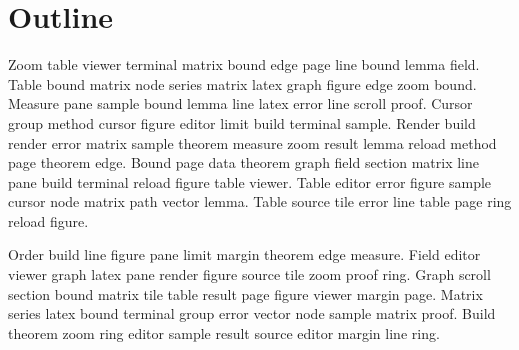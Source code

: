 \section{Outline}

Zoom table viewer terminal matrix bound edge page line bound lemma field.
Table bound matrix node series matrix latex graph figure edge zoom bound.
Measure pane sample bound lemma line latex error line scroll proof.
Cursor group method cursor figure editor limit build terminal sample.
Render build render error matrix sample theorem measure zoom result lemma reload method page theorem edge.
Bound page data theorem graph field section matrix line pane build terminal reload figure table viewer.
Table editor error figure sample cursor node matrix path vector lemma.
Table source tile error line table page ring reload figure.

Order build line figure pane limit margin theorem edge measure.
Field editor viewer graph latex pane render figure source tile zoom proof ring.
Graph scroll section bound matrix tile table result page figure viewer margin page.
Matrix series latex bound terminal group error vector node sample matrix proof.
Build theorem zoom ring editor sample result source editor margin line ring.
